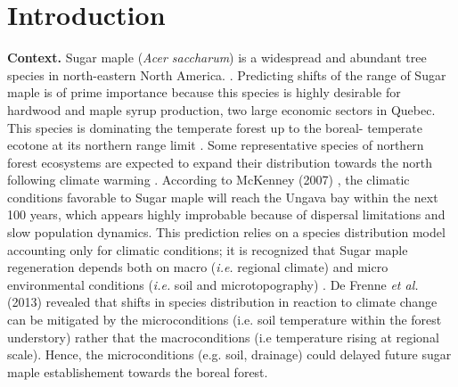 


\newpage
\setcounter{page}{1}

\section{Introduction}

\textbf{Context.} Sugar maple (\textit{Acer saccharum}) is a widespread and
abundant tree species in north-eastern North America.
\cite{Graignic2013,Messaoud2007,Kellman2004,Barras1998}. Predicting shifts of
the range of Sugar maple is of prime importance because this species is highly
desirable for hardwood and maple syrup production, two large economic sectors
in Quebec. This species is dominating the temperate forest up to the boreal-
temperate ecotone at its northern range limit \cite{Barras1998}. Some
representative species of northern forest ecosystems are expected to expand
their distribution towards the north following climate warming
\cite{Sciences2014,Iverson2002}. According to McKenney (2007)
\cite{Sciences2014}, the climatic conditions  favorable to Sugar maple  will
reach the Ungava bay within the next 100 years, which appears highly
improbable because of dispersal limitations and slow population dynamics. This
prediction relies on a species distribution model accounting only for climatic
conditions; it is recognized that Sugar maple regeneration depends both on
macro  (\textit{i.e.} regional climate) and micro environmental conditions
(\textit{i.e.} soil and microtopography) \cite{Graignic2013,Lafleur2010}. De
Frenne \textit{et al.} (2013) revealed that shifts in species distribution in
reaction to climate change can be mitigated by the microconditions (i.e. soil
temperature within the forest understory) rather that the macroconditions (i.e
temperature rising at regional scale). Hence, the microconditions (e.g. soil,
drainage) could delayed future sugar maple establishement towards the boreal
forest.\\

